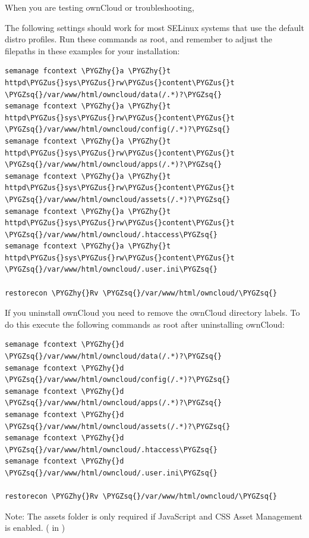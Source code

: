 \documentclass[letterpaper,10pt,english]{sphinxmanual}
\def\PYGZus{\char`\_}
\def\PYGZhy{\char`\-}
\def\PYGZsq{\char`\'}
\renewcommand\PYGZsq{\textquotesingle}
\begin{document}
When you are testing ownCloud or troubleshooting,

The following settings should work for most SELinux systems that use the
default distro profiles. Run these commands as root, and remember to adjust the filepaths
in these examples for your installation:

\begin{Verbatim}[commandchars=\\\{\}]
semanage fcontext \PYGZhy{}a \PYGZhy{}t httpd\PYGZus{}sys\PYGZus{}rw\PYGZus{}content\PYGZus{}t \PYGZsq{}/var/www/html/owncloud/data(/.*)?\PYGZsq{}
semanage fcontext \PYGZhy{}a \PYGZhy{}t httpd\PYGZus{}sys\PYGZus{}rw\PYGZus{}content\PYGZus{}t \PYGZsq{}/var/www/html/owncloud/config(/.*)?\PYGZsq{}
semanage fcontext \PYGZhy{}a \PYGZhy{}t httpd\PYGZus{}sys\PYGZus{}rw\PYGZus{}content\PYGZus{}t \PYGZsq{}/var/www/html/owncloud/apps(/.*)?\PYGZsq{}
semanage fcontext \PYGZhy{}a \PYGZhy{}t httpd\PYGZus{}sys\PYGZus{}rw\PYGZus{}content\PYGZus{}t \PYGZsq{}/var/www/html/owncloud/assets(/.*)?\PYGZsq{}
semanage fcontext \PYGZhy{}a \PYGZhy{}t httpd\PYGZus{}sys\PYGZus{}rw\PYGZus{}content\PYGZus{}t \PYGZsq{}/var/www/html/owncloud/.htaccess\PYGZsq{}
semanage fcontext \PYGZhy{}a \PYGZhy{}t httpd\PYGZus{}sys\PYGZus{}rw\PYGZus{}content\PYGZus{}t \PYGZsq{}/var/www/html/owncloud/.user.ini\PYGZsq{}

restorecon \PYGZhy{}Rv \PYGZsq{}/var/www/html/owncloud/\PYGZsq{}
\end{Verbatim}

If you uninstall ownCloud you need to remove the ownCloud directory labels. To do
this execute the following commands as root after uninstalling ownCloud:

\begin{Verbatim}[commandchars=\\\{\}]
semanage fcontext \PYGZhy{}d \PYGZsq{}/var/www/html/owncloud/data(/.*)?\PYGZsq{}
semanage fcontext \PYGZhy{}d \PYGZsq{}/var/www/html/owncloud/config(/.*)?\PYGZsq{}
semanage fcontext \PYGZhy{}d \PYGZsq{}/var/www/html/owncloud/apps(/.*)?\PYGZsq{}
semanage fcontext \PYGZhy{}d \PYGZsq{}/var/www/html/owncloud/assets(/.*)?\PYGZsq{}
semanage fcontext \PYGZhy{}d \PYGZsq{}/var/www/html/owncloud/.htaccess\PYGZsq{}
semanage fcontext \PYGZhy{}d \PYGZsq{}/var/www/html/owncloud/.user.ini\PYGZsq{}

restorecon \PYGZhy{}Rv \PYGZsq{}/var/www/html/owncloud/\PYGZsq{}
\end{Verbatim}

Note: The assets folder is only required if JavaScript and CSS Asset Management is enabled. ( in )
\end{document}
